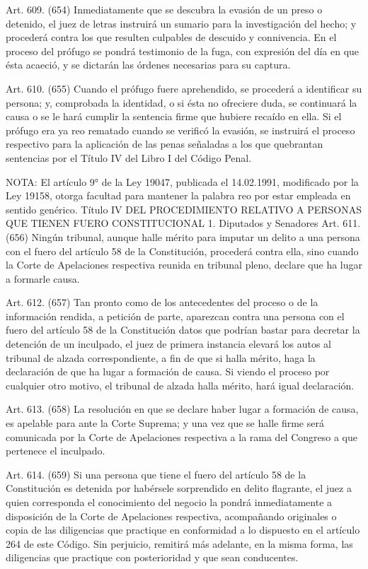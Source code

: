     Art. 609. (654) Inmediatamente que se descubra la evasión de un preso o detenido, el juez de letras instruirá un sumario para la investigación del hecho; y procederá contra los que resulten culpables de descuido y connivencia.
    En el proceso del prófugo se pondrá testimonio de la fuga, con expresión del día en que ésta acaeció, y se dictarán las órdenes necesarias para su captura.

    Art. 610. (655) Cuando el prófugo fuere aprehendido, se procederá a identificar su persona; y, comprobada la identidad, o si ésta no ofreciere duda, se continuará la causa o se le hará cumplir la sentencia firme que hubiere recaído en ella.
    Si el prófugo era ya reo rematado cuando se verificó la evasión, se instruirá el proceso respectivo para la aplicación de las penas señaladas a los que quebrantan sentencias por el Título IV del Libro I del Código Penal.


NOTA:
      El artículo 9° de la Ley 19047, publicada el 14.02.1991, modificado por la Ley 19158, otorga facultad para mantener la palabra reo por estar empleada en sentido genérico.
    Título IV
    DEL PROCEDIMIENTO RELATIVO A PERSONAS QUE TIENEN
FUERO CONSTITUCIONAL
    1. Diputados y Senadores
    Art. 611. (656) Ningún tribunal, aunque halle mérito para imputar un delito a una persona con el fuero del artículo 58 de la Constitución, procederá contra ella, sino cuando la Corte de Apelaciones respectiva reunida en tribunal pleno, declare que ha lugar a formarle causa.

    Art. 612. (657) Tan pronto como de los antecedentes del proceso o de la información rendida, a petición de parte, aparezcan contra una persona con el fuero del artículo 58 de la Constitución datos que podrían bastar para decretar la detención de un inculpado, el juez de primera instancia elevará los autos al tribunal de alzada correspondiente, a fin de que si halla mérito, haga la declaración de que ha lugar a formación de causa.
    Si viendo el proceso por cualquier otro motivo, el tribunal de alzada halla mérito, hará igual declaración.

    Art. 613. (658) La resolución en que se declare haber lugar a formación de causa, es apelable para ante la Corte Suprema; y una vez que se halle firme será comunicada por la Corte de Apelaciones respectiva a la rama del Congreso a que pertenece el inculpado.

    Art. 614. (659) Si una persona que tiene el fuero del artículo 58 de la Constitución es detenida por habérsele sorprendido en delito flagrante, el juez a quien corresponda el conocimiento del negocio la pondrá inmediatamente a disposición de la Corte de Apelaciones respectiva, acompañando originales o copia de las diligencias que practique en conformidad a lo dispuesto en el artículo 264 de este Código.
    Sin perjuicio, remitirá más adelante, en la misma forma, las diligencias que practique con posterioridad y que sean conducentes.

